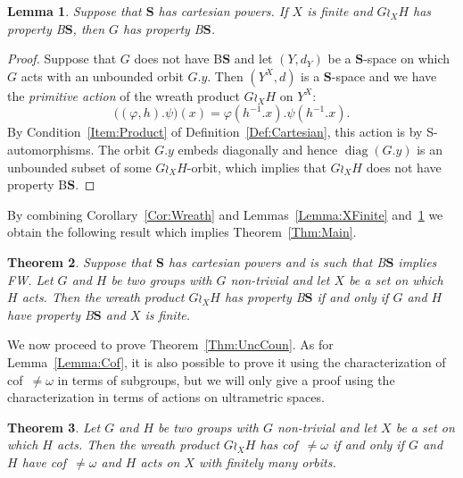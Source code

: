 \documentclass[a4paper]{article}
\newtheorem{lem}{Lemma}[section]
\newtheorem{thm}[lem]{Theorem}
\theoremstyle{definition}
\DeclareMathOperator\diag{diag}
\newcommand*{\BS}{B$\mathbf{S}$}
\begin{document}
%
%
\begin{lem}\label{Lemma:Unboundedness}
Suppose that $\mathbf{S}$ has cartesian powers. If $X$ is finite and $G\wr_XH$ has property \BS, then $G$ has property \BS.
\end{lem}
\begin{proof}
Suppose that $G$ does not have \BS{} and let $(Y,d_Y)$ be a $\mathbf S$-space on which $G$ acts with an unbounded orbit $G.y$.
Then $(Y^X,d)$ is a $\mathbf S$-space and we have the \emph{primitive action} of the wreath product $G\wr_XH$ on $Y^X$:
\[
	\bigl((\varphi,h).\psi\bigr)(x)=\varphi(h^{-1}.x).\psi(h^{-1}.x).
\]
By Condition~\ref{Item:Product} of Definition~\ref{Def:Cartesian}, this action is by S-automorphisms.
The orbit $G.y$ embeds diagonally and hence $\diag(G.y)$ is an unbounded subset of some $G\wr_XH$-orbit, which implies that $G\wr_XH$ does not have property \BS.
\end{proof}
%
%
By combining Corollary~\ref{Cor:Wreath} and Lemmas~\ref{Lemma:XFinite} and~\ref{Lemma:Unboundedness} we obtain the following result which implies Theorem~\ref{Thm:Main}.
%
%
\begin{thm}\label{Thm:Technic}
Suppose that $\mathbf{S}$ has cartesian powers and is such that \BS{} implies FW.
Let $G$ and $H$ be two groups with $G$ non-trivial and let $X$ be a set on which $H$ acts. Then the wreath product $G \wr_X H$ has property \BS{} if and only if $G$ and $H$ have property \BS{} and $X$ is finite.
\end{thm}
%
%
We now proceed to prove Theorem~\ref{Thm:UncCoun}.
As for Lemma~\ref{Lemma:Cof}, it is also possible to prove it using the characterization of cof~$\neq\omega$ in terms of subgroups, but we will only give a proof using the characterization in terms of actions on ultrametric spaces.
%
%
\begin{thm}
Let $G$ and $H$ be two groups with $G$ non-trivial and let $X$ be a set on which $H$ acts. Then the wreath product $G \wr_X H$ has cof~$\neq\omega$ if and only if $G$ and $H$ have cof~$\neq\omega$ and $H$ acts on $X$ with finitely many orbits.
\end{thm}
\end{document}
